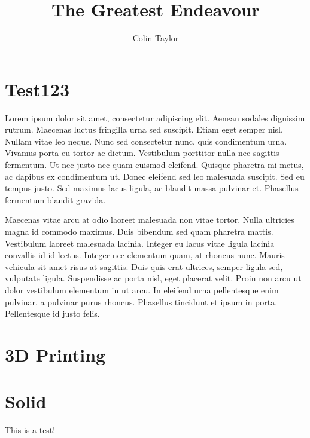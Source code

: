\documentclass{report}
\title{The Greatest Endeavour}
\author{Colin Taylor}
\begin{document}
\maketitle
\chapter{Test123}
Lorem ipsum dolor sit amet, consectetur adipiscing elit. Aenean sodales dignissim rutrum. Maecenas luctus fringilla urna sed suscipit. Etiam eget semper nisl. Nullam vitae leo neque. Nunc sed consectetur nunc, quis condimentum urna. Vivamus porta eu tortor ac dictum. Vestibulum porttitor nulla nec sagittis fermentum. Ut nec justo nec quam euismod eleifend. Quisque pharetra mi metus, ac dapibus ex condimentum ut. Donec eleifend sed leo malesuada suscipit. Sed eu tempus justo. Sed maximus lacus ligula, ac blandit massa pulvinar et. Phasellus fermentum blandit gravida.

Maecenas vitae arcu at odio laoreet malesuada non vitae tortor. Nulla ultricies magna id commodo maximus. Duis bibendum sed quam pharetra mattis. Vestibulum laoreet malesuada lacinia. Integer eu lacus vitae ligula lacinia convallis id id lectus. Integer nec elementum quam, at rhoncus nunc. Mauris vehicula sit amet risus at sagittis. Duis quis erat ultrices, semper ligula sed, vulputate ligula. Suspendisse ac porta nisl, eget placerat velit. Proin non arcu ut dolor vestibulum elementum in ut arcu. In eleifend urna pellentesque enim pulvinar, a pulvinar purus rhoncus. Phasellus tincidunt et ipsum in porta. Pellentesque id justo felis.
\chapter{3D Printing}
\chapter{Solid}
This is a test!
\end{document}
